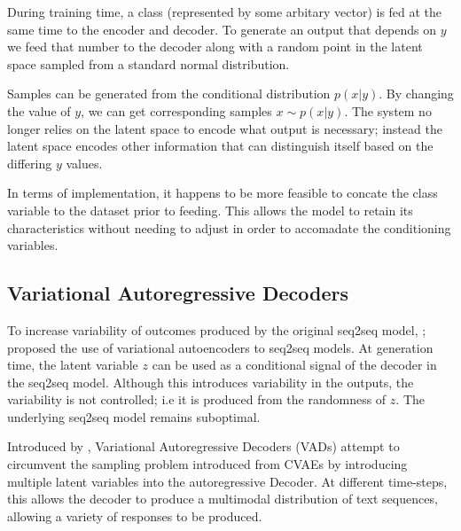 \documentclass[12pt,twoside]{report}
\begin{document}
During training time, a class (represented by some arbitary vector) is fed at the same time to the encoder and decoder. To generate an output that depends on $y$ we feed that number to the decoder along with a random point in the latent space sampled from a standard normal distribution.

Samples can be generated from the conditional distribution $p(x|y)$. By changing the value of $y$, we can get corresponding samples $x \sim p(x|y)$. The system no longer relies on the latent space to encode what output is necessary; instead the latent space encodes other information that can distinguish itself based on the differing $y$ values.



In terms of implementation, it happens to be more feasible to concate the class variable to the dataset prior to feeding. This allows the model to retain its characteristics without needing to adjust in order to accomadate the conditioning variables.


\subsection{Variational Autoregressive Decoders}

To increase variability of outcomes produced by the original seq2seq model, \cite{serban_hierarchical_2016}; \cite{zhao_learning_2017} proposed the use of variational autoencoders to seq2seq models. At generation time, the latent variable $z$ can be used as a conditional signal of the decoder in the seq2seq model. Although this introduces variability in the outputs, the variability is not controlled; i.e it is produced from the randomness of $z$. The underlying seq2seq model remains suboptimal.

Introduced by \cite{du_variational_2018}, Variational Autoregressive Decoders (VADs) attempt to circumvent the sampling problem introduced from CVAEs by introducing multiple latent variables into the autoregressive Decoder. At different time-steps, this allows the decoder to produce a multimodal distribution of text sequences, allowing a variety of responses to be produced. 
\end{document}
